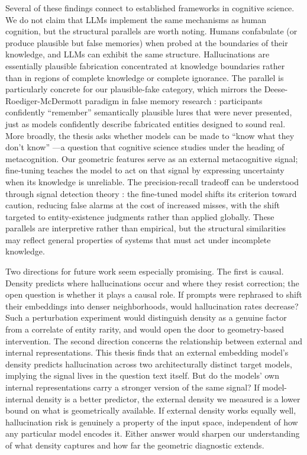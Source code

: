 Several of these findings connect to established frameworks in cognitive science. We do not claim that LLMs implement the same mechanisms as human cognition, but the structural parallels are worth noting. Humans confabulate (or produce plausible but false memories) when probed at the boundaries of their knowledge, and LLMs can exhibit the same structure. Hallucinations are essentially plausible fabrication concentrated at knowledge boundaries rather than in regions of complete knowledge or complete ignorance. The parallel is particularly concrete for our plausible-fake category, which mirrors the Deese-Roediger-McDermott paradigm in false memory research \citep{roediger1995creating}: participants confidently ``remember'' semantically plausible lures that were never presented, just as models confidently describe fabricated entities designed to sound real. More broadly, the thesis asks whether models can be made to ``know what they don't know'' \citep{kadavath2022language}---a question that cognitive science studies under the heading of metacognition. Our geometric features serve as an external metacognitive signal; fine-tuning teaches the model to act on that signal by expressing uncertainty when its knowledge is unreliable. The precision-recall tradeoff can be understood through signal detection theory \citep{green1966signal}: the fine-tuned model shifts its criterion toward caution, reducing false alarms at the cost of increased misses, with the shift targeted to entity-existence judgments rather than applied globally. These parallels are interpretive rather than empirical, but the structural similarities may reflect general properties of systems that must act under incomplete knowledge.

Two directions for future work seem especially promising. The first is causal. Density predicts where hallucinations occur and where they resist correction; the open question is whether it plays a causal role. If prompts were rephrased to shift their embeddings into denser neighborhoods, would hallucination rates decrease? Such a perturbation experiment would distinguish density as a genuine factor from a correlate of entity rarity, and would open the door to geometry-based intervention. The second direction concerns the relationship between external and internal representations. This thesis finds that an external embedding model's density predicts hallucination across two architecturally distinct target models, implying the signal lives in the question text itself. But do the models' own internal representations carry a stronger version of the same signal? If model-internal density is a better predictor, the external density we measured is a lower bound on what is geometrically available. If external density works equally well, hallucination risk is genuinely a property of the input space, independent of how any particular model encodes it. Either answer would sharpen our understanding of what density captures and how far the geometric diagnostic extends.

